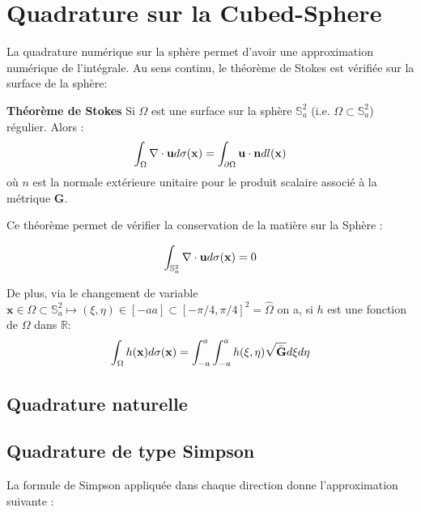 \section{Quadrature sur la Cubed-Sphere}

La quadrature numérique sur la sphère permet d'avoir une approximation numérique de l'intégrale. 
Au sens continu, le théorème de Stokes est vérifiée sur la surface de la sphère:

\begin{theoreme}
\textbf{Théorème de Stokes}
Si $\Omega$ est une surface sur la sphère $\mathbb{S}_a^2$ (i.e. $\Omega \subset \mathbb{S}_a^2$) régulier. Alors :
\begin{equation}
\displaystyle\int_\Omega \nabla \cdot \mathbf{u} d \sigma (\mathbf{x}) = \displaystyle\int_{\partial \Omega} \mathbf{u} \cdot \mathbf{n} dl(\mathbf{x})
\end{equation}
où $n$ est la normale extérieure unitaire pour le produit scalaire associé à la métrique $\mathbf{G}$.
\label{th: Stokes}
\end{theoreme}

Ce théorème permet de vérifier la conservation de la matière sur la Sphère :

\begin{equation}
\displaystyle\int_{\mathbb{S}_a^2}\nabla \cdot \mathbf{u} d \sigma (\mathbf{x}) = 0
\label{eq: Stokes global}
\end{equation}

De plus, via le changement de variable $\mathbf{x} \in \Omega \subset \mathbb{S}_a^2 \mapsto (\xi, \eta) \in [-a a] \subset [- \pi/4, \pi/4]^2 = \hat{\Omega}$ on a, si $h$ est une fonction de $\Omega$ dans $\mathbb{R}$:
\begin{equation}
\displaystyle\int_{\Omega} h(\mathbf{x}) d \sigma ( \mathbf{x} ) = \displaystyle\int_{-a}^a \displaystyle\int_{-a}^a h(\xi, \eta) \sqrt{\bar{\mathbf{G}}}d\xi d\eta
\end{equation}

\subsection{Quadrature naturelle}



\subsection{Quadrature de type Simpson}

La formule de Simpson appliquée dans chaque direction donne l'approximation suivante :

